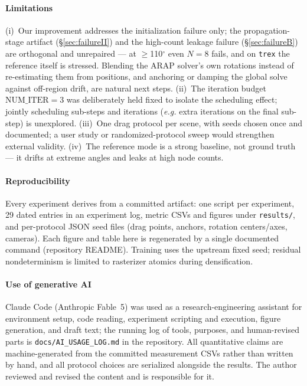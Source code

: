 \documentclass[10pt,twocolumn]{article}
\newcommand{\eg}{\emph{e.g.}}
\begin{document}
\paragraph{Limitations}
(i)~Our improvement addresses the initialization failure only; the
propagation-stage artifact (\S\ref{sec:failureII}) and the high-count leakage
failure (\S\ref{sec:failureB}) are orthogonal and unrepaired --- at
$\geq$110$^\circ$ even $N{=}8$ fails, and on \texttt{trex} the reference itself
is stressed. Blending the ARAP solver's own rotations instead of re-estimating
them from positions, and anchoring or damping the global solve against
off-region drift, are natural next steps. (ii)~The iteration budget
$\mathrm{NUM\_ITER}=3$ was deliberately held fixed to isolate the scheduling
effect; jointly scheduling sub-steps and iterations (\eg{} extra iterations on
the final sub-step) is unexplored. (iii)~One drag protocol per scene, with
seeds chosen once and documented; a user study or randomized-protocol sweep
would strengthen external validity. (iv)~The reference mode is a strong
baseline, not ground truth --- it drifts at extreme angles and leaks at high
node counts.

\paragraph{Reproducibility}
Every experiment derives from a committed artifact: one script per experiment,
29 dated entries in an experiment log, metric CSVs and figures under
\texttt{results/}, and per-protocol JSON seed files (drag points, anchors,
rotation centers/axes, cameras). Each figure and table here is regenerated by a
single documented command (repository README). Training uses the upstream fixed
seed; residual nondeterminism is limited to rasterizer atomics during
densification.

\paragraph{Use of generative AI}
Claude Code (Anthropic Fable~5) was used as a research-engineering assistant
for environment setup, code reading, experiment scripting and execution, figure
generation, and draft text; the running log of tools, purposes, and
human-revised parts is \texttt{docs/AI\_USAGE\_LOG.md} in the repository. All
quantitative claims are machine-generated from the committed measurement CSVs
rather than written by hand, and all protocol choices are serialized alongside
the results. The author reviewed and revised the content and is responsible for
it.
\end{document}
